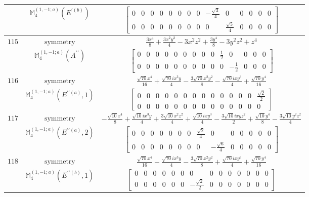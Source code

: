 \documentclass[fleqn,8pt,landscape]{jsarticle}
\begin{document}
\begin{longtable}{ccc}
$  $ & $ \mathbb{M}_{4}^{(1,-1;a)}(E^{\prime(b)}) $ & $ \begin{bmatrix} 0 & 0 & 0 & 0 & 0 & 0 & 0 & 0 & - \frac{\sqrt{3}}{4} & 0 & 0 & 0 & 0 & 0 \\ 0 & 0 & 0 & 0 & 0 & 0 & 0 & 0 & 0 & \frac{\sqrt{5}}{4} & 0 & 0 & 0 & 0 \end{bmatrix} $ \\ \hline
$ 115 $ & $ \text{symmetry} $ & $ \frac{3 x^{4}}{8} + \frac{3 x^{2} y^{2}}{4} - 3 x^{2} z^{2} + \frac{3 y^{4}}{8} - 3 y^{2} z^{2} + z^{4} $ \\
$  $ & $ \mathbb{M}_{4}^{(1,-1;a)}(A^{\prime\prime}) $ & $ \begin{bmatrix} 0 & 0 & 0 & 0 & 0 & 0 & 0 & 0 & 0 & \frac{1}{2} & 0 & 0 & 0 & 0 \\ 0 & 0 & 0 & 0 & 0 & 0 & 0 & 0 & 0 & 0 & - \frac{1}{2} & 0 & 0 & 0 \end{bmatrix} $ \\ \hline
$ 116 $ & $ \text{symmetry} $ & $ \frac{\sqrt{70} x^{4}}{16} + \frac{\sqrt{70} i x^{3} y}{4} - \frac{3 \sqrt{70} x^{2} y^{2}}{8} - \frac{\sqrt{70} i x y^{3}}{4} + \frac{\sqrt{70} y^{4}}{16} $ \\
$  $ & $ \mathbb{M}_{4}^{(1,-1;a)}(E^{\prime\prime(a)},1) $ & $ \begin{bmatrix} 0 & 0 & 0 & 0 & 0 & 0 & 0 & 0 & 0 & 0 & 0 & 0 & 0 & \frac{\sqrt{2}}{2} \\ 0 & 0 & 0 & 0 & 0 & 0 & 0 & 0 & 0 & 0 & 0 & 0 & 0 & 0 \end{bmatrix} $ \\ \hline
$ 117 $ & $ \text{symmetry} $ & $ - \frac{\sqrt{10} x^{4}}{8} + \frac{\sqrt{10} i x^{3} y}{4} + \frac{3 \sqrt{10} x^{2} z^{2}}{4} + \frac{\sqrt{10} i x y^{3}}{4} - \frac{3 \sqrt{10} i x y z^{2}}{2} + \frac{\sqrt{10} y^{4}}{8} - \frac{3 \sqrt{10} y^{2} z^{2}}{4} $ \\
$  $ & $ \mathbb{M}_{4}^{(1,-1;a)}(E^{\prime\prime(a)},2) $ & $ \begin{bmatrix} 0 & 0 & 0 & 0 & 0 & 0 & 0 & \frac{\sqrt{2}}{4} & 0 & 0 & 0 & 0 & 0 & 0 \\ 0 & 0 & 0 & 0 & 0 & 0 & 0 & 0 & - \frac{\sqrt{6}}{4} & 0 & 0 & 0 & 0 & 0 \end{bmatrix} $ \\ \hline
$ 118 $ & $ \text{symmetry} $ & $ \frac{\sqrt{70} x^{4}}{16} - \frac{\sqrt{70} i x^{3} y}{4} - \frac{3 \sqrt{70} x^{2} y^{2}}{8} + \frac{\sqrt{70} i x y^{3}}{4} + \frac{\sqrt{70} y^{4}}{16} $ \\
$  $ & $ \mathbb{M}_{4}^{(1,-1;a)}(E^{\prime\prime(b)},1) $ & $ \begin{bmatrix} 0 & 0 & 0 & 0 & 0 & 0 & 0 & 0 & 0 & 0 & 0 & 0 & 0 & 0 \\ 0 & 0 & 0 & 0 & 0 & 0 & - \frac{\sqrt{2}}{2} & 0 & 0 & 0 & 0 & 0 & 0 & 0 \end{bmatrix} $ \\ \hline

\end{longtable}
\end{document}
